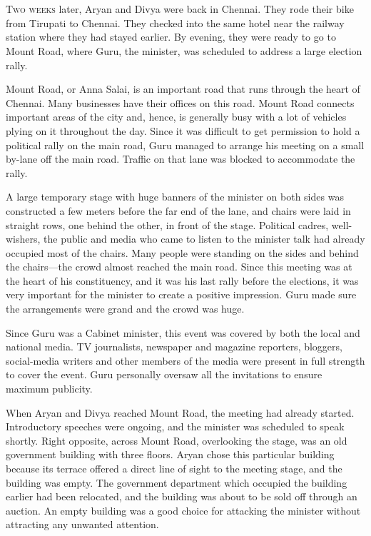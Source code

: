 \chapter{}

\lettrine{T}{wo weeks} later, Aryan and Divya were back in Chennai. They rode
their bike from Tirupati to Chennai. They checked into the same hotel near the
railway station where they had stayed earlier. By evening, they were ready to go
to Mount Road, where Guru, the minister, was scheduled to address a large
election rally.

Mount Road, or Anna Salai, is an important road that runs through the heart of
Chennai. Many businesses have their offices on this road. Mount Road connects
important areas of the city and, hence, is generally busy with a lot of vehicles
plying on it throughout the day. Since it was difficult to get permission
to hold a political rally on the main road, Guru managed to arrange his meeting
on a small by-lane off the main road. Traffic on that lane was blocked to
accommodate the rally.

A large temporary stage with huge banners of the minister on both sides was
constructed a few meters before the far end of the lane, and chairs were laid in
straight rows, one behind the other, in front of the stage. Political cadres,
well-wishers, the public and media who came to listen to the minister talk had
already occupied most of the chairs. Many people were standing on the sides and
behind the chairs—the crowd almost reached the main road. Since this meeting was
at the heart of his constituency, and it was his last rally before the
elections, it was very important for the minister to create a positive
impression. Guru made sure the arrangements were grand and the crowd was huge.

Since Guru was a Cabinet minister, this event was covered by both the local and
national media. TV journalists, newspaper and magazine reporters, bloggers,
social-media writers and other members of the media were present in full
strength to cover the event. Guru personally oversaw all the invitations to
ensure maximum publicity.

When Aryan and Divya reached Mount Road, the meeting had already started.
Introductory speeches were ongoing, and the minister was scheduled to speak shortly.
Right opposite, across Mount Road, overlooking the stage, was an old government
building with three floors. Aryan chose this particular building because its
terrace offered a direct line of sight to the meeting stage, and the building was
empty. The government department which occupied the building earlier had been
relocated, and the building was about to be sold off through an auction. An empty
building was a good choice for attacking the minister without attracting any
unwanted attention.


